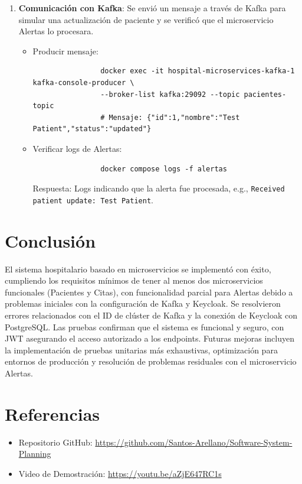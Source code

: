 \documentclass{article}
\begin{document}
\begin{enumerate}
    \item \textbf{Comunicación con Kafka}: Se envió un mensaje a través de Kafka para simular una actualización de paciente y se verificó que el microservicio Alertas lo procesara.
        \begin{itemize}
            \item Producir mensaje:
                \begin{verbatim}
                docker exec -it hospital-microservices-kafka-1 kafka-console-producer \
                --broker-list kafka:29092 --topic pacientes-topic
                # Mensaje: {"id":1,"nombre":"Test Patient","status":"updated"}
                \end{verbatim}

            \item Verificar logs de Alertas:
                \begin{verbatim}
                docker compose logs -f alertas
                \end{verbatim}
                Respuesta: Logs indicando que la alerta fue procesada, e.g., \texttt{Received patient update: Test Patient}.
        \end{itemize}
\end{enumerate}

\section{Conclusión}
El sistema hospitalario basado en microservicios se implementó con éxito, cumpliendo los requisitos mínimos de tener al menos dos microservicios funcionales (Pacientes y Citas), con funcionalidad parcial para Alertas debido a problemas iniciales con la configuración de Kafka y Keycloak. Se resolvieron errores relacionados con el ID de clúster de Kafka y la conexión de Keycloak con PostgreSQL. Las pruebas confirman que el sistema es funcional y seguro, con JWT asegurando el acceso autorizado a los endpoints. Futuras mejoras incluyen la implementación de pruebas unitarias más exhaustivas, optimización para entornos de producción y resolución de problemas residuales con el microservicio Alertas.

\section{Referencias}
\begin{itemize}
    \item Repositorio GitHub: \url{https://github.com/Santos-Arellano/Software-System-Planning}
    \item Video de Demostración: \url{https://youtu.be/aZjE647RC1s}
\end{itemize}
\end{document}

